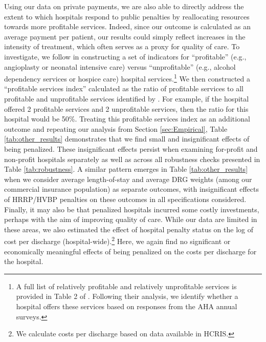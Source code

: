 \documentclass[12pt]{article}
\begin{document}
Using our data on private payments, we are also able to directly address the extent to which hospitals respond to public penalties by reallocating resources towards more profitable services.  Indeed, since our outcome is calculated as an average payment per patient, our results could simply reflect increases in the intensity of treatment, which often serves as a proxy for quality of care.    To investigate, we follow \cite{horwitz2009} in constructing a set of indicators for ``profitable'' (e.g., angioplasty or neonatal intensive care) versus ``unprofitable'' (e.g., alcohol dependency services or hospice care) hospital services.\footnote{A full list of relatively profitable and relatively unprofitable services is provided in Table 2 of \cite{horwitz2009}. Following their analysis, we identify whether a hospital offers these services based on responses from the AHA annual surveys.} We then constructed a ``profitable services index'' calculated as the ratio of profitable services to all profitable and unprofitable services identified by \cite{horwitz2009}. For example, if the hospital offered 2 profitable services and 2 unprofitable services, then the ratio for this hospital would be 50\%. Treating this profitable services index as an additional outcome and repeating our analysis from Section \ref{sec:Empirical}, Table \ref{tab:other_results} demonstrates that we find small and insignificant effects of being penalized. These insignificant effects persist when examining for-profit and non-profit hospitals separately as well as across all robustness checks presented in Table \ref{tab:robustness}.  A similar pattern emerges in Table \ref{tab:other_results} when we consider average length-of-stay and average DRG weights (among our commercial insurance population) as separate outcomes, with insignificant effects of HRRP/HVBP penalties on these outcomes in all specifications considered.  Finally, it may also be that penalized hospitals incurred some costly investments, perhaps with the aim of improving quality of care. While our data are limited in these areas, we also estimated the effect of hospital penalty status on the log of cost per discharge (hospital-wide).\footnote{We calculate costs per discharge based on data available in HCRIS.} Here, we again find no significant or economically meaningful effects of being penalized on the costs per discharge for the hospital.
\end{document}
